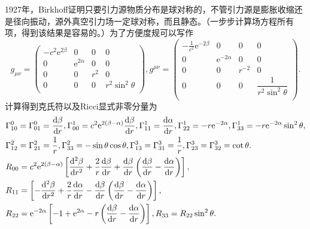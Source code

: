 \documentclass[11pt, a4paper, oneside, onecolumn]{ctexart}
\numberwithin{equation}{subsection}
\begin{document}
1927年，Birkhoff证明只要引力源物质分布是球对称的，不管引力源是膨胀收缩还是径向振动，源外真空引力场一定球对称，而且静态。（一步步计算场方程所有项，得到该结果是容易的。）为了方便度规可以写作
\begin{equation}
g_{\mu\nu}=\begin{pmatrix}
-c^{2}\mathrm{e}^{2\beta} & 0 & 0 & 0\\
0 & \mathrm{e}^{2\alpha} & 0 & 0\\
0 & 0 & r^{2} & 0\\
0 & 0 & 0 & r^{2}\sin^{2}\theta\\
\end{pmatrix},
g^{\mu\nu}=\begin{pmatrix}
-\frac{1}{c^{2}}\mathrm{e}^{-2\beta} & 0 & 0 & 0\\
0 & \mathrm{e}^{-2\alpha} & 0 & 0\\
0 & 0 & r^{-2} & 0\\
0 & 0 & 0 & \dfrac{1}{r^{2}\sin^{2}\theta}\\
\end{pmatrix}.
\end{equation}
计算得到克氏符以及Ricci显式非零分量为
\begin{align}
&\Gamma_{10}^{0}=\Gamma_{01}^{0}=\frac{\mathrm{d}\beta}{\mathrm{d}r},\Gamma_{00}^{1}=c^{2}\mathrm{e}^{2\left(\beta-\alpha\right)}\frac{\mathrm{d}\beta}{\mathrm{d}r},\Gamma_{11}^{1}=\frac{\mathrm{d}\alpha}{\mathrm{d}r},\Gamma_{22}^{1}=-r\mathrm{e}^{-2\alpha},\Gamma_{33}^{1}=-r\mathrm{e}^{-2\alpha}\sin^{2}\theta,\notag\\
&\Gamma_{12}^{2}=\Gamma_{21}^{2}=\frac{1}{r},\Gamma_{33}^{2}=-\sin\theta\cos\theta,\Gamma_{13}^{3}=\Gamma_{31}^{3}=\frac{1}{r},\Gamma_{23}^{3}=\Gamma_{32}^{3}=\cot\theta.\notag\\
&R_{00}=c^{2}\mathrm{e}^{2\left(\beta-\alpha\right)}\left[\frac{\mathrm{d}^{2}\beta}{\mathrm{d}r^{2}}+\frac{2}{r}\frac{\mathrm{d}\beta}{\mathrm{d}r}+\frac{\mathrm{d}\beta}{\mathrm{d}r}\left(\frac{\mathrm{d}\beta}{\mathrm{d}r}-\frac{\mathrm{d}\alpha}{\mathrm{d}r}\right)\right],\notag\\
&R_{11}=\left[-\frac{\mathrm{d}^{2}\beta}{\mathrm{d}r^{2}}+\frac{2}{r}\frac{\mathrm{d}\alpha}{\mathrm{d}r}-\frac{\mathrm{d}\beta}{\mathrm{d}r}\left(\frac{\mathrm{d}\beta}{\mathrm{d}r}-\frac{\mathrm{d}\alpha}{\mathrm{d}r}\right)\right],\notag\\
&R_{22}=\mathrm{e}^{-2\alpha}\left[-1+\mathrm{e}^{2\alpha}-r\left(\frac{\mathrm{d}\beta}{\mathrm{d}r}-\frac{\mathrm{d}\alpha}{\mathrm{d}r}\right)\right],R_{33}=R_{22}\sin^{2}\theta.\notag
\end{align}
\end{document}
